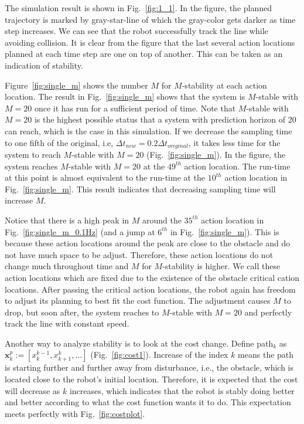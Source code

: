 \documentclass[letterpaper, 10 pt, conference]{ieeeconf}  %
\begin{document}
The simulation result is shown in Fig.~\ref{fig:1_1}. In the figure, the planned trajectory is marked by gray-star-line of which the gray-color gets darker as time step increases. We can see that the robot successfully track the line while avoiding collision. It is clear from the figure that the last several action locations planned at each time step are one on top of another. This can be taken as an indication of stability. 


Figure~\ref{fig:single_m} shows the number $M$ for $M$-stability at each action location. The result in Fig.~\ref{fig:single_m} shows that the system is $M$-stable with $M=20$ once it has run for a sufficient period of time. Note that $M$-stable with $M=20$ is the highest possible status that a system with prediction horizon of 20 can reach, which is the case in this simulation. If we decrease the sampling time to one fifth of the original, i.e, $\Delta t_{new}=0.2\Delta t_{original}$, it takes less time for the system to reach $M$-stable with $M=20$ (Fig.~\ref{fig:single_m}). In the figure, the system reaches $M$-stable with $M=20$ at the $49^{th}$ action location. The run-time at this point is almost equivalent to the run-time at the $10^{th}$ action location in Fig.~\ref{fig:single_m}. This result indicates that decreasing sampling time will increase $M$.

Notice that there is a high peak in $M$ around the $35^{th}$ action location in Fig.~\ref{fig:single_m_0.1Hz} (and a jump at $6^{th}$ in Fig.~\ref{fig:single_m}). This is because these action locations around the peak are close to the obstacle and do not have much space to be adjust. Therefore, these action locations do not change much throughout time and $M$ for $M$-stability is higher. We call these action locations which are fixed due to the existence of the obstacle critical cation locations. After passing the critical action locations, the robot again has freedom to adjust its planning to best fit the cost function. The adjustment causes $M$ to drop, but soon after, the system reaches to $M$-stable with $M=20$ and perfectly track the line with constant speed. 

Another way to analyze stability is to look at the cost change. Define path$_k$ as $\mathbf{x}_{k}^{p} := [x_{k}^{k-1},x_{k+1}^{k},\ldots]$ (Fig.~\ref{fig:cost1}). Increase of the index $k$ means the path is starting further and further away from disturbance, i.e., the obstacle, which is located close to the robot's initial location. Therefore, it is expected that the cost will decrease as $k$ increases, which indicates that the robot is stably doing better and better according to what the cost function wants it to do. This expectation meets perfectly with Fig.~\ref{fig:costplot}. 
\end{document}

